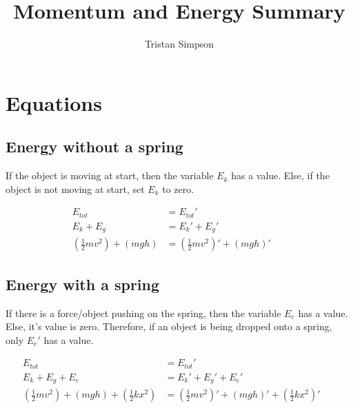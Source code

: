 \documentclass{article}
\title{Momentum and Energy Summary}
\author{Tristan Simpson}
\begin{document}
\maketitle

\section{Equations}
\begin{adjustwidth}{1cm}{0pt}
    \subsection{Energy without a spring}
    \begin{flushleft}
        If the object is moving at start, then the variable $E_{k}$ has a value. Else, if the object is not moving at start, set $E_{k}$ to zero.
    \end{flushleft}
    \begin{align*}
        E_{tot}                   & = E_{tot}\prime                              \\
        E_{k} + E_{g}             & = E_{k}\prime + E_{g}\prime                  \\
        (\frac{1}{2}mv^2) + (mgh) & = (\frac{1}{2}mv^2)\prime + (mgh)\prime &  &
    \end{align*}
    \vspace*{0.03cm}
    \subsection{Energy with a spring}
    \begin{flushleft}
        If there is a force/object pushing on the spring, then the variable $E_{e}$ has a value. Else, it's value is zero. Therefore, if an object is being dropped onto a spring, only $E_{e}\prime$ has a value.
    \end{flushleft}
    \begin{align*}
        E_{tot}                                       & = E_{tot}\prime                                                        \\
        E_{k} + E_{g}     + E_{e}                     & = E_{k}\prime + E_{g}\prime  + E_{e}\prime                             \\
        (\frac{1}{2}mv^2) + (mgh) + (\frac{1}{2}kx^2) & = (\frac{1}{2}mv^2)\prime + (mgh)\prime + (\frac{1}{2}kx^2)\prime &  &
    \end{align*}
    \vspace*{0.03cm}

\end{adjustwidth}
\end{document}
